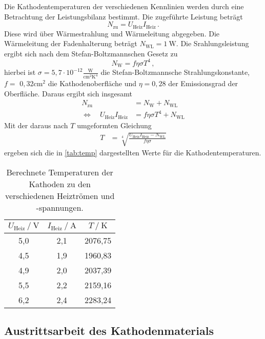 Die Kathodentemperaturen der verschiedenen Kennlinien werden durch eine Betrachtung der Leistungsbilanz bestimmt.
Die zugeführte Leistung beträgt
\begin{equation*}
  N_{\text{zu}}=U_{\text{Heiz}} I_{\text{Heiz}} \, .
\end{equation*}
Diese wird über Wärmestrahlung und Wärmeleitung abgegeben. 
Die Wärmeleitung der Fadenhalterung beträgt $N_{\text{WL}} = \qty{1}{\watt}$. 
Die Srahlungsleistung ergibt sich nach dem Stefan-Boltzmannschen Gesetz zu
\begin{equation*}
  N_{\mathrm{W}}=f \eta \sigma T^{4} \, ,
\end{equation*}
hierbei ist $\sigma=5,7 \cdot 10^{-12} \frac{\mathrm{W}}{\mathrm{cm}^{2} \mathrm{K}^{4}}$ die Stefan-Boltzmannsche Strahlungskonstante, 
$f=$ $0,32 \mathrm{cm}^{2}$ die Kathodenoberfläche und $\eta=0,28$ der Emissionsgrad der Oberfläche. 
Daraus ergibt sich insgesamt
\begin{align*}
N_{\text{zu}} &=N_{\text{W}}+N_{\text{WL}} \\
\Leftrightarrow \quad U_{\text{Heiz}} I_{\text{Heiz}} &=f \eta \sigma T^{4}+N_{\text{WL}}
\end{align*}
Mit der daraus nach $T$ umgeformten Gleichung
\begin{align*}
  T &= \sqrt[4]{ \frac {U_\text{Heiz} I_\text{Heiz} - N_\mathrm{WL}} {f \eta \sigma} } 
\end{align*}
ergeben sich die in \autoref{tab:temp} dargestellten Werte für die Kathodentemperaturen.
\begin{table}
  \centering
  \caption{Berechnete Temperaturen der Kathoden zu den verschiedenen Heiztrömen und -spannungen.}
  \label{tab:temp}
  \begin{tabular}{c c c}
    \toprule
    $U_\text{Heiz} \mathbin{/} \unit{\volt}$ &
    $I_\text{Heiz} \mathbin{/} \unit{\ampere}$ &
    $T \mathbin{/} \unit{\kelvin}$ \\
    \midrule
    5,0 &  2,1 & 2076,75 \\
    4,5 &  1,9 & 1960,83 \\
    4,9 &  2,0 & 2037,39 \\
    5,5 &  2,2 & 2159,16 \\
    6,2 &  2,4 & 2283,24 \\
    \bottomrule
  \end{tabular}
\end{table}

\subsection{Austrittsarbeit des Kathodenmaterials}

